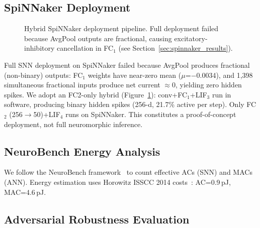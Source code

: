 \documentclass[sigconf,nonacm=false]{acmart}
\begin{document}
\subsection{SpiNNaker Deployment}

\begin{figure}[t]
\centering
{}
\caption{Hybrid SpiNNaker deployment pipeline. Full deployment failed because AvgPool outputs are fractional, causing excitatory-inhibitory cancellation in FC$_1$ (see Section~\ref{sec:spinnaker_results}).}
\label{fig:pipeline}
\end{figure}

Full SNN deployment on SpiNNaker failed because AvgPool produces fractional (non-binary) outputs: FC$_1$ weights have near-zero mean ($\mu$=$-$0.0034), and 1{,}398 simultaneous fractional inputs produce net current $\approx$0, yielding zero hidden spikes. We adopt an FC2-only hybrid (Figure~\ref{fig:pipeline}): conv+FC$_1$+LIF$_3$ run in software, producing binary hidden spikes (256-d, 21.7\% active per step). Only FC$_2$ (256$\to$50)+LIF$_4$ runs on SpiNNaker. This constitutes a proof-of-concept deployment, not full neuromorphic inference.

\subsection{NeuroBench Energy Analysis}

We follow the NeuroBench framework~\cite{yik2025} to count effective ACs (SNN) and MACs (ANN). Energy estimation uses Horowitz ISSCC 2014 costs~\cite{horowitz2014}: AC=0.9\,pJ, MAC=4.6\,pJ.

\subsection{Adversarial Robustness Evaluation}
\end{document}
